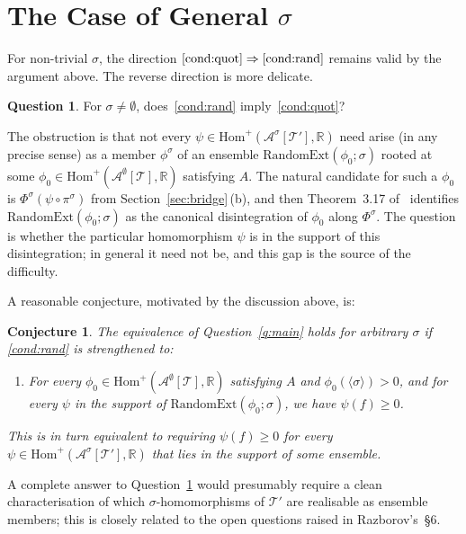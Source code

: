 \documentclass[11pt]{article}
\newtheorem{conjecture}[theorem]{Conjecture}
\theoremstyle{definition}
\newtheorem{question}[theorem]{Question}
\newcommand{\R}{\mathbb{R}}
\newcommand{\A}{\mathcal{A}}
\newcommand{\T}{\mathcal{T}}
\newcommand{\Homp}{\mathrm{Hom}^{+}}
\newcommand{\RandomExt}{\mathrm{RandomExt}}
\begin{document}
\section{The Case of General \texorpdfstring{$\sigma$}{sigma}}

For non-trivial $\sigma$, the direction $\ref{cond:quot} \Rightarrow
\ref{cond:rand}$ remains valid by the argument above. The reverse direction
is more delicate.

\begin{question}\label{q:gen}
For $\sigma \neq \emptyset$, does~\ref{cond:rand} imply~\ref{cond:quot}?
\end{question}

The obstruction is that not every $\psi \in \Homp(\A^{\sigma}[\T'], \R)$ need
arise (in any precise sense) as a member $\phi^{\sigma}$ of an ensemble
$\RandomExt(\phi_0; \sigma)$ rooted at some
$\phi_0 \in \Homp(\A^{\emptyset}[\T], \R)$ satisfying $A$. The natural candidate
for such a $\phi_0$ is $\Phi^{\sigma}(\psi \circ \pi^{\sigma})$ from
Section~\ref{sec:bridge}\,(b), and then Theorem~3.17 of~\cite{Razborov2007}
identifies $\RandomExt(\phi_0; \sigma)$ as the canonical disintegration of
$\phi_0$ along $\Phi^{\sigma}$. The question is whether the particular
homomorphism $\psi$ is in the support of this disintegration; in general it
need not be, and this gap is the source of the difficulty.

A reasonable conjecture, motivated by the discussion above, is:

\begin{conjecture}
The equivalence of Question~\ref{q:main} holds for arbitrary $\sigma$ if
\ref{cond:rand} is strengthened to:
\begin{enumerate}[label=\textup{(2$'$)}, leftmargin=3em]
  \item For every $\phi_0 \in \Homp(\A^{\emptyset}[\T], \R)$ satisfying $A$
        and $\phi_0(\langle \sigma \rangle) > 0$, and for every
        $\psi$ in the support of $\RandomExt(\phi_0; \sigma)$, we have
        $\psi(f) \geq 0$.
\end{enumerate}
This is in turn equivalent to requiring $\psi(f) \geq 0$ for every
$\psi \in \Homp(\A^{\sigma}[\T'], \R)$ that lies in the support of some
ensemble.
\end{conjecture}

A complete answer to Question~\ref{q:gen} would presumably require a
clean characterisation of which $\sigma$-homomorphisms of $\T'$ are
realisable as ensemble members; this is closely related to the open
questions raised in Razborov's~\S6.
\end{document}
